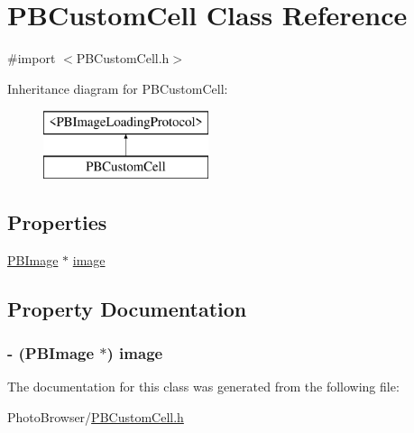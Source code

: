 \hypertarget{interface_p_b_custom_cell}{
\section{PBCustomCell Class Reference}
\label{interface_p_b_custom_cell}
}


{\ttfamily \#import $<$PBCustomCell.h$>$}

Inheritance diagram for PBCustomCell:\begin{figure}[H]
\begin{center}
\leavevmode
\includegraphics[height=2cm]{interface_p_b_custom_cell}
\end{center}
\end{figure}
\subsection*{Properties}
\begin{DoxyCompactItemize}
\item 
\hyperlink{interface_p_b_image}{PBImage} $\ast$ \hyperlink{interface_p_b_custom_cell_af302f7b0dab3ec4ef87f21c52d431152}{image}
\end{DoxyCompactItemize}


\subsection{Property Documentation}
\hypertarget{interface_p_b_custom_cell_af302f7b0dab3ec4ef87f21c52d431152}{
\subsubsection[{image}]{\setlength{\rightskip}{0pt plus 5cm}-\/ ({\bf PBImage} $\ast$) image}}
\label{interface_p_b_custom_cell_af302f7b0dab3ec4ef87f21c52d431152}


The documentation for this class was generated from the following file:\begin{DoxyCompactItemize}
\item 
PhotoBrowser/\hyperlink{_p_b_custom_cell_8h}{PBCustomCell.h}\end{DoxyCompactItemize}
